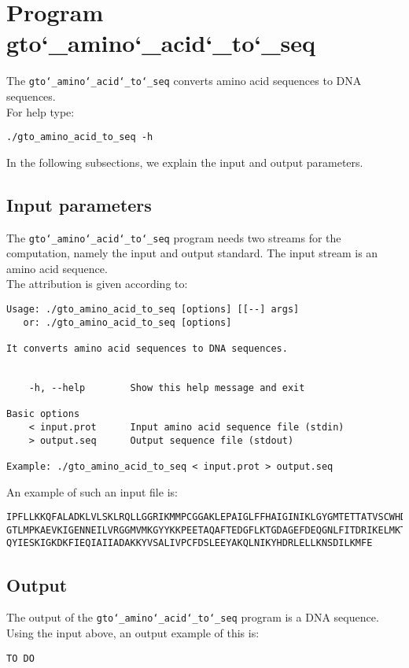 \section{Program gto\char`_amino\char`_acid\char`_to\char`_seq}
The \texttt{gto\char`_amino\char`_acid\char`_to\char`_seq} converts amino acid sequences to DNA sequences.\\
For help type:
\begin{lstlisting}
./gto_amino_acid_to_seq -h
\end{lstlisting}
In the following subsections, we explain the input and output parameters.

\subsection*{Input parameters}

The \texttt{gto\char`_amino\char`_acid\char`_to\char`_seq} program needs two streams for the computation, namely the input and output standard. The input stream is an amino acid sequence.\\
The attribution is given according to:
\begin{lstlisting}
Usage: ./gto_amino_acid_to_seq [options] [[--] args]
   or: ./gto_amino_acid_to_seq [options]

It converts amino acid sequences to DNA sequences.


    -h, --help        Show this help message and exit

Basic options
    < input.prot      Input amino acid sequence file (stdin)
    > output.seq      Output sequence file (stdout)

Example: ./gto_amino_acid_to_seq < input.prot > output.seq
\end{lstlisting}
An example of such an input file is:
\begin{lstlisting}
IPFLLKKQFALADKLVLSKLRQLLGGRIKMMPCGGAKLEPAIGLFFHAIGINIKLGYGMTETTATVSCWHDFQFNPNSI
GTLMPKAEVKIGENNEILVRGGMVMKGYYKKPEETAQAFTEDGFLKTGDAGEFDEQGNLFITDRIKELMKTSNGKYIAP
QYIESKIGKDKFIEQIAIIADAKKYVSALIVPCFDSLEEYAKQLNIKYHDRLELLKNSDILKMFE
\end{lstlisting}

\subsection*{Output}

The output of the \texttt{gto\char`_amino\char`_acid\char`_to\char`_seq} program is a DNA sequence.\\
Using the input above, an output example of this is:
\begin{lstlisting}
TO DO
\end{lstlisting}
